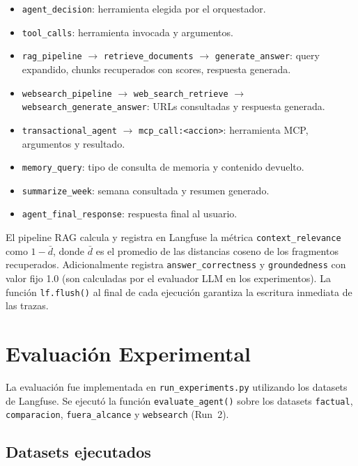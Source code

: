 \documentclass[conference]{IEEEtran}
\begin{document}
\begin{itemize}
    \item \texttt{agent\_decision}: herramienta elegida por el orquestador.
    \item \texttt{tool\_calls}: herramienta invocada y argumentos.
    \item \texttt{rag\_pipeline} $\to$ \texttt{retrieve\_documents} $\to$ \texttt{generate\_answer}: query expandido, chunks recuperados con scores, respuesta generada.
    \item \texttt{websearch\_pipeline} $\to$ \texttt{web\_search\_retrieve} $\to$ \texttt{websearch\_generate\_answer}: URLs consultadas y respuesta generada.
    \item \texttt{transactional\_agent} $\to$ \texttt{mcp\_call:<accion>}: herramienta MCP, argumentos y resultado.
    \item \texttt{memory\_query}: tipo de consulta de memoria y contenido devuelto.
    \item \texttt{summarize\_week}: semana consultada y resumen generado.
    \item \texttt{agent\_final\_response}: respuesta final al usuario.
\end{itemize}

El pipeline RAG calcula y registra en Langfuse la métrica \texttt{context\_relevance} como $1 - \bar{d}$, donde $\bar{d}$ es el promedio de las distancias coseno de los fragmentos recuperados. Adicionalmente registra \texttt{answer\_correctness} y \texttt{groundedness} con valor fijo 1.0 (son calculadas por el evaluador LLM en los experimentos). La función \texttt{lf.flush()} al final de cada ejecución garantiza la escritura inmediata de las trazas.

\section{Evaluación Experimental}

La evaluación fue implementada en \texttt{run\_experiments.py} utilizando los datasets de Langfuse. Se ejecutó la función \texttt{evaluate\_agent()} sobre los datasets \texttt{factual}, \texttt{comparacion}, \texttt{fuera\_alcance} y \texttt{websearch} (Run~2).

\subsection{Datasets ejecutados}
\end{document}
